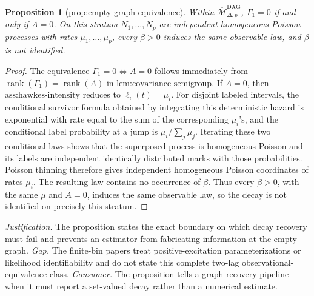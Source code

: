 \documentclass{article}
\newtheorem{proposition}{Proposition}
\begin{document}
\begin{proposition}[prop:empty-graph-equivalence]\label{prop:empty-graph-equivalence}
Within \(\overline{\mathcal M}_{\Delta,p}^{\mathrm{DAG}}\), \(\Gamma_1=0\) if and only if \(A=0\). On this stratum \(N_1,\ldots,N_p\) are independent homogeneous Poisson processes with rates \(\mu_1,\ldots,\mu_p\), every \(\beta>0\) induces the same observable law, and \(\beta\) is not identified.
\end{proposition}
\begin{proof}
The equivalence \(\Gamma_1=0\Longleftrightarrow A=0\) follows immediately from \(\operatorname{rank}(\Gamma_1)=\operatorname{rank}(A)\) in \(\text{lem:covariance-semigroup}\).  If \(A=0\), then \(\text{ass:hawkes-intensity}\) reduces to \(\ell_i(t)=\mu_i\).  For disjoint labeled intervals, the conditional survivor formula obtained by integrating this deterministic hazard is exponential with rate equal to the sum of the corresponding \(\mu_i\)'s, and the conditional label probability at a jump is \(\mu_i/\sum_j\mu_j\).  Iterating these two conditional laws shows that the superposed process is homogeneous Poisson and its labels are independent identically distributed marks with those probabilities.  Poisson thinning therefore gives independent homogeneous Poisson coordinates of rates \(\mu_i\).  The resulting law contains no occurrence of \(\beta\).  Thus every \(\beta>0\), with the same \(\mu\) and \(A=0\), induces the same observable law, so the decay is not identified on precisely this stratum.
\end{proof}
\par\smallskip\noindent \textit{Justification.} The proposition states the exact boundary on which decay recovery must fail and prevents an estimator from fabricating information at the empty graph. \textit{Gap.} The finite-bin papers treat positive-excitation parameterizations or likelihood identifiability and do not state this complete two-lag observational-equivalence class. \textit{Consumer.} The proposition tells a graph-recovery pipeline when it must report a set-valued decay rather than a numerical estimate.
\end{document}

